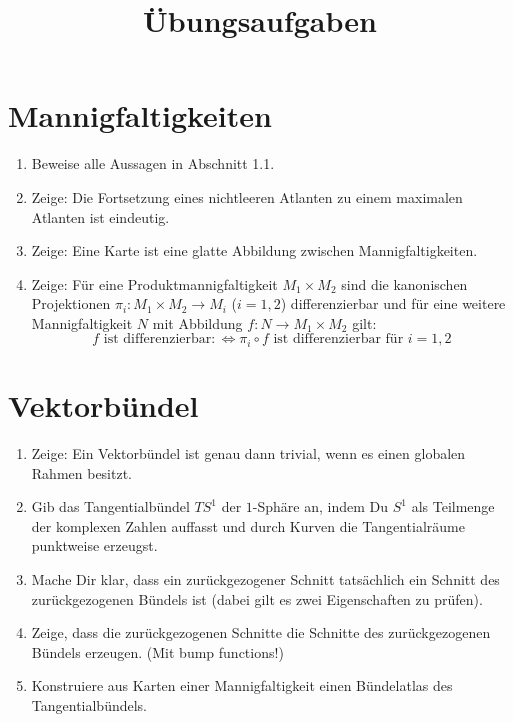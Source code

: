 \documentclass[a4paper]{scrartcl}
\title{Übungsaufgaben}
\begin{document}
	\maketitle
	\section{Mannigfaltigkeiten}
	\begin{enumerate}
		\item Beweise alle Aussagen in Abschnitt 1.1.
		\item Zeige: Die Fortsetzung eines nichtleeren Atlanten zu einem maximalen Atlanten ist eindeutig.
		\item Zeige: Eine Karte ist eine glatte Abbildung zwischen Mannigfaltigkeiten.
		\item Zeige: Für eine Produktmannigfaltigkeit $M_1\times M_2$ sind die kanonischen Projektionen $\pi_i\colon M_1\times M_2\rightarrow M_i$ ($i=1,2$) differenzierbar und für eine weitere Mannigfaltigkeit $N$ mit Abbildung $f\colon N\rightarrow M_1\times M_2$ gilt:
		\begin{equation}
			\text{$f$ ist differenzierbar} \colon\Leftrightarrow \pi_i\circ f \text{ ist differenzierbar für } i=1,2
		\end{equation}
	\end{enumerate}
	\section{Vektorbündel}
	\begin{enumerate}
		\item Zeige: Ein Vektorbündel ist genau dann trivial, wenn es einen globalen Rahmen besitzt.
		\item Gib das Tangentialbündel $TS^1$ der $1$-Sphäre an, indem Du $S^1$ als Teilmenge der komplexen Zahlen auffasst und durch Kurven die Tangentialräume punktweise erzeugst.
		\item Mache Dir klar, dass ein zurückgezogener Schnitt tatsächlich ein Schnitt des zurückgezogenen Bündels ist (dabei gilt es zwei Eigenschaften zu prüfen).
		\item Zeige, dass die zurückgezogenen Schnitte die Schnitte des zurückgezogenen Bündels erzeugen. (Mit bump functions!)
		\item Konstruiere aus Karten einer Mannigfaltigkeit einen Bündelatlas des Tangentialbündels.
	\end{enumerate}
\end{document}
